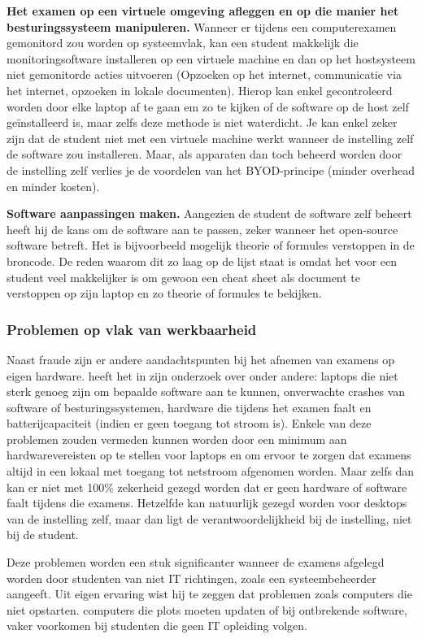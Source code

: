 \textbf{Het examen op een virtuele omgeving afleggen en op die manier het besturingssysteem manipuleren.} Wanneer er tijdens een computerexamen gemonitord zou worden op systeemvlak, kan een student makkelijk die monitoringsoftware installeren op een virtuele machine en dan op het hostsysteem niet gemonitorde acties uitvoeren (Opzoeken op het internet, communicatie via het internet, opzoeken in lokale documenten). Hierop kan enkel gecontroleerd worden door elke laptop af te gaan em zo te kijken of de software op de host zelf ge\"{i}nstalleerd is, maar zelfs deze methode is niet waterdicht. Je kan enkel zeker zijn dat de student niet met een virtuele machine werkt wanneer de instelling zelf de software zou installeren. Maar, als apparaten dan toch beheerd worden door de instelling zelf verlies je de voordelen van het BYOD-principe (minder overhead en minder kosten).

\textbf{Software aanpassingen maken.} Aangezien de student de software zelf beheert heeft hij de kans om de software aan te passen, zeker wanneer het open-source software betreft. Het is bijvoorbeeld mogelijk theorie of formules verstoppen in de broncode. De reden waarom dit zo laag op de lijst staat is omdat het voor een student veel makkelijker is om gewoon een cheat sheet als document te verstoppen op zijn laptop en zo theorie of formules te bekijken. 

\subsubsection{Problemen op vlak van werkbaarheid}
Naast fraude zijn er andere aandachtspunten bij het afnemen van examens op eigen hardware. \textcite{Hillier2015} heeft het in zijn onderzoek over onder andere: laptops die niet sterk genoeg zijn om bepaalde software aan te kunnen, onverwachte crashes van software of besturingssystemen, hardware die tijdens het examen faalt en batterijcapaciteit (indien er geen toegang tot stroom is). Enkele van deze problemen zouden vermeden kunnen worden door een minimum aan hardwarevereisten op te stellen voor laptops en om ervoor te zorgen dat examens altijd in een lokaal met toegang tot netstroom afgenomen worden. Maar zelfs dan kan er niet met 100\% zekerheid gezegd worden dat er geen hardware of software faalt tijdens die examens. Hetzelfde kan natuurlijk gezegd worden voor desktops van de instelling zelf, maar dan ligt de verantwoordelijkheid bij de instelling, niet bij de student. 

Deze problemen worden een stuk significanter wanneer de examens afgelegd worden door studenten van niet IT richtingen, zoals een systeembeheerder aangeeft. Uit eigen ervaring wist hij te zeggen dat problemen zoals computers die niet opstarten. computers die plots moeten updaten of bij ontbrekende software,  vaker voorkomen bij studenten die geen IT opleiding volgen. 


